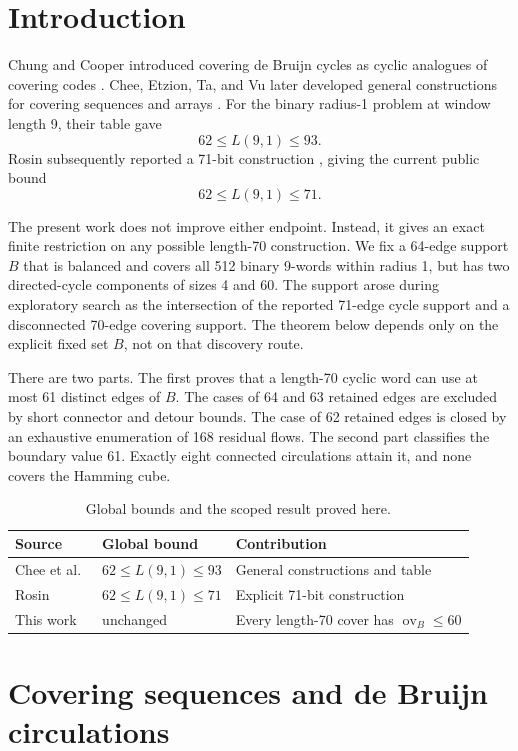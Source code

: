 \documentclass[11pt]{article}
\theoremstyle{definition}
\theoremstyle{remark}
\newcommand{\ov}{\operatorname{ov}}
\begin{document}
\section{Introduction}

Chung and Cooper introduced covering de Bruijn cycles as cyclic analogues
of covering codes \cite{chung-cooper}.  Chee, Etzion, Ta, and Vu later
developed general constructions for covering sequences and arrays
\cite{chee-et-al}.  For the binary radius-1 problem at window length 9,
their table gave
\[
  62\leq L(9,1)\leq 93.
\]
Rosin subsequently reported a 71-bit construction \cite{rosin}, giving
the current public bound
\[
  62\leq L(9,1)\leq 71.
\]

The present work does not improve either endpoint.  Instead, it gives an
exact finite restriction on any possible length-70 construction.  We fix
a 64-edge support $B$ that is balanced and covers all 512 binary 9-words
within radius 1, but has two directed-cycle components of sizes 4 and 60.
The support arose during exploratory search as the intersection of the
reported 71-edge cycle support and a disconnected 70-edge covering
support.  The theorem below depends only on the explicit fixed set $B$,
not on that discovery route.

There are two parts.  The first proves that a length-70 cyclic word can
use at most 61 distinct edges of $B$.  The cases of 64 and 63 retained
edges are excluded by short connector and detour bounds.  The case of 62
retained edges is closed by an exhaustive enumeration of 168 residual
flows.  The second part classifies the boundary value 61.  Exactly eight
connected circulations attain it, and none covers the Hamming cube.

\begin{table}[ht]
\centering
\begin{tabular}{@{}lll@{}}
\toprule
Source & Global bound & Contribution \\
\midrule
Chee et al.\ \cite{chee-et-al} & $62\leq L(9,1)\leq 93$ &
General constructions and table \\
Rosin \cite{rosin} & $62\leq L(9,1)\leq 71$ &
Explicit 71-bit construction \\
This work & unchanged &
Every length-70 cover has $\ov_B\leq 60$ \\
\bottomrule
\end{tabular}
\caption{Global bounds and the scoped result proved here.}
\label{tab:bounds}
\end{table}

\section{Covering sequences and de Bruijn circulations}
\end{document}
